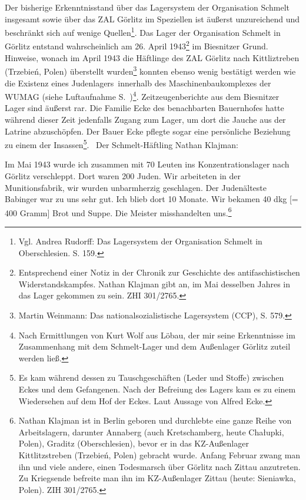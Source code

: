 \documentclass[a4paper,12pt,ngerman,
]{nisebook}
\begin{document}
\newline
Der bisherige Erkenntnisstand über das Lagersystem der Organisation Schmelt insgesamt sowie über das ZAL Görlitz im Speziellen ist äußerst unzureichend und beschränkt sich auf wenige Quellen\footnote{Vgl. Andrea Rudorff: Das Lagersystem der Organisation Schmelt in Oberschlesien. S. 159.}.
Das Lager der Organisation Schmelt in Görlitz entstand wahrscheinlich am 26. April 1943\footnote{Entsprechend einer Notiz in der \glqq Chronik zur Geschichte des antifaschistischen Widerstandskampfes\grqq. Nathan Klajman gibt an, im Mai desselben Jahres in das Lager gekommen zu sein. ZHI 301/2765.} im Biesnitzer Grund. Hinweise, wonach im April 1943 die Häftlinge des ZAL Görlitz nach Kittliztreben (Trzebień, Polen) überstellt wurden\footnote{Martin Weinmann: Das nationalsozialistische Lagersystem (CCP), S. 579.} konnten ebenso wenig bestätigt werden wie die Existenz eines \glqq Judenlagers\grqq~innerhalb des Maschinenbaukomplexes der WUMAG (siehe Luftaufnahme S.~\pageref{maschinenbaufoto})\footnote{Nach Ermittlungen von Kurt Wolf aus Löbau, der mir seine Erkenntnisse im Zusammenhang mit dem Schmelt-Lager und dem Außenlager Görlitz zuteil werden ließ.}.
Zeitzeugenberichte aus dem Biesnitzer Lager sind äußerst rar. Die Familie Ecke des benachbarten Bauernhofes hatte während dieser Zeit jedenfalls Zugang zum Lager, um dort die Jauche aus der Latrine abzuschöpfen. Der Bauer Ecke pflegte sogar eine persönliche Beziehung zu einem der Insassen\footnote{Es kam während dessen zu Tauschgeschäften (Leder und Stoffe) zwischen Eckes und dem Gefangenen. Nach der Befreiung des Lagers kam es zu einem Wiedersehen auf dem Hof der Eckes. Laut Aussage von Alfred Ecke.}.~\newline
Der Schmelt-Häftling Nathan Klajman:
\begin{leftbar}
Im Mai 1943 wurde ich zusammen mit 70 Leuten ins Konzentrationslager nach Görlitz verschleppt. Dort waren 200 Juden. Wir arbeiteten in der Munitionsfabrik, wir wurden unbarmherzig geschlagen. Der Judenälteste Babinger war zu uns sehr gut.
Ich blieb dort 10 Monate. Wir bekamen 40 dkg [= 400 Gramm] Brot und Suppe. Die Meister misshandelten uns.\footnote{Nathan Klajman ist in Berlin geboren und durchlebte eine ganze Reihe von Arbeitslagern, darunter Annaberg (auch \glqq Kretschamberg\grqq, heute Cha\l upki, Polen), Graditz (Oberschlesien), bevor er in das KZ-Außenlager Kittlitzstreben (Trzebień, Polen) gebracht wurde. Anfang Februar zwang man ihn und viele andere, einen Todesmarsch über Görlitz nach Zittau anzutreten. Zu Kriegsende befreite man ihn im KZ-Außenlager Zittau (heute: Sieniawka, Polen). ZIH 301/2765.}
\end{leftbar}
\end{document}
